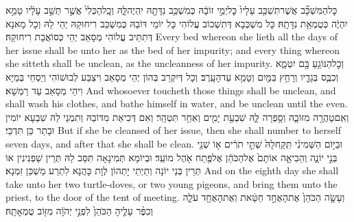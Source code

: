{כׇּל\maqqaf הַמִּשְׁכָּ֞ב אֲשֶׁר\maqqaf תִּשְׁכַּ֤ב עָלָיו֙ כׇּל\maqqaf יְמֵ֣י זוֹבָ֔הּ כְּמִשְׁכַּ֥ב נִדָּתָ֖הּ יִֽהְיֶה\maqqaf לָּ֑הּ וְכׇֽל\maqqaf הַכְּלִי֙ אֲשֶׁ֣ר תֵּשֵׁ֣ב עָלָ֔יו טָמֵ֣א יִהְיֶ֔ה כְּטֻמְאַ֖ת נִדָּתָֽהּ׃}
{כָּל מִשְׁכְּבָא דְּתִשְׁכוֹב עֲלוֹהִי כָּל יוֹמֵי דּוֹבַהּ כְּמִשְׁכַּב רִיחוּקַהּ יְהֵי לַהּ וְכָל מָאנָא דְּתִתֵּיב עֲלוֹהִי מְסָאַב יְהֵי כְּסוֹאֲבָת רִיחוּקַהּ׃}
{Every bed whereon she lieth all the days of her issue shall be unto her as the bed of her impurity; and every thing whereon she sitteth shall be unclean, as the uncleanness of her impurity.}{}
{וְכׇל\maqqaf הַנּוֹגֵ֥עַ בָּ֖ם יִטְמָ֑א וְכִבֶּ֧ס בְּגָדָ֛יו וְרָחַ֥ץ בַּמַּ֖יִם וְטָמֵ֥א עַד\maqqaf הָעָֽרֶב׃}
{וְכָל דְּיִקְרַב בְּהוֹן יְהֵי מְסָאַב וִיצַבַּע לְבוּשׁוֹהִי וְיַסְחֵי בְּמַיָּא וִיהֵי מְסָאַב עַד רַמְשָׁא׃}
{And whosoever toucheth those things shall be unclean, and shall wash his clothes, and bathe himself in water, and be unclean until the even.}{}
{וְאִֽם\maqqaf טָהֲרָ֖ה מִזּוֹבָ֑הּ וְסָ֥פְרָה לָּ֛הּ שִׁבְעַ֥ת יָמִ֖ים וְאַחַ֥ר תִּטְהָֽר׃}
{וְאִם דְּכִיאַת מִדּוֹבַהּ וְתִמְנֵי לַהּ שִׁבְעָא יוֹמִין וּבָתַר כֵּן תִּדְכֵּי׃}
{But if she be cleansed of her issue, then she shall number to herself seven days, and after that she shall be clean.}{}
{וּבַיּ֣וֹם הַשְּׁמִינִ֗י תִּֽקַּֽח\maqqaf לָהּ֙ שְׁתֵּ֣י תֹרִ֔ים א֥וֹ שְׁנֵ֖י בְּנֵ֣י יוֹנָ֑ה וְהֵבִיאָ֤ה אוֹתָם֙ אֶל\maqqaf הַכֹּהֵ֔ן אֶל\maqqaf פֶּ֖תַח אֹ֥הֶל מוֹעֵֽד׃}
{וּבְיוֹמָא תְּמִינָאָה תִּסַּב לַהּ תְּרֵין שַׁפְנִינִין אוֹ תְּרֵין בְּנֵי יוֹנָה וְתַיְתֵי יָתְהוֹן לְוָת כָּהֲנָא לִתְרַע מַשְׁכַּן זִמְנָא׃}
{And on the eighth day she shall take unto her two turtle-doves, or two young pigeons, and bring them unto the priest, to the door of the tent of meeting.}{}
{וְעָשָׂ֤ה הַכֹּהֵן֙ אֶת\maqqaf הָאֶחָ֣ד חַטָּ֔את וְאֶת\maqqaf הָאֶחָ֖ד עֹלָ֑ה וְכִפֶּ֨ר עָלֶ֤יהָ הַכֹּהֵן֙ לִפְנֵ֣י יְהֹוָ֔ה מִזּ֖וֹב טֻמְאָתָֽהּ׃}
